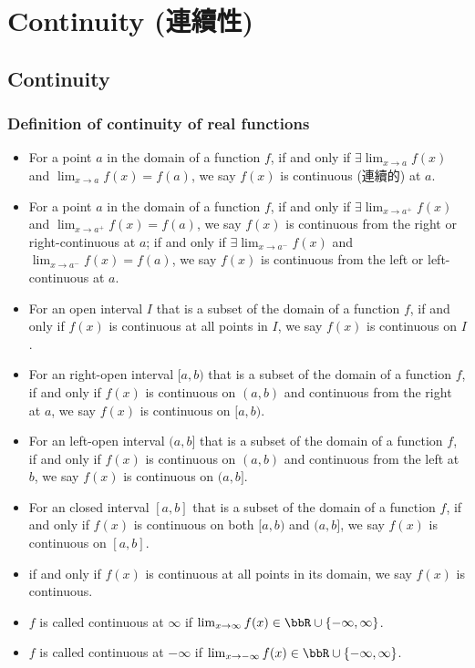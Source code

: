\section{Continuity (連續性)}
\subsection{Continuity}
\subsubsection{Definition of continuity of real functions}
\begin{itemize}
\item For a point $a$ in the domain of a function $f$, if and only if $\exists\lim_{x\to a}f(x)$ and $\lim_{x\to a}f(x)=f(a)$, we say $f(x)$ is continuous (連續的) at $a$.
\item For a point $a$ in the domain of a function $f$, if and only if $\exists\lim_{x\to a^+}f(x)$ and $\lim_{x\to a^+}f(x)=f(a)$, we say $f(x)$ is continuous from the right or right-continuous at $a$; if and only if $\exists \lim_{x\to a^-} f(x)$ and $\lim_{x\to a^-} f(x)=f(a)$, we say $f(x)$ is continuous from the left or left-continuous at $a$.
\item For an open interval $I$ that is a subset of the domain of a function $f$, if and only if $f(x)$ is continuous at all points in $I$, we say $f(x)$ is continuous on $I$.
\item For an right-open interval $[a,b)$ that is a subset of the domain of a function $f$, if and only if $f(x)$ is continuous on $(a,b)$ and continuous from the right at $a$, we say $f(x)$ is continuous on $[a,b)$.
\item For an left-open interval $(a,b]$ that is a subset of the domain of a function $f$, if and only if $f(x)$ is continuous on $(a,b)$ and continuous from the left at $b$, we say $f(x)$ is continuous on $(a,b]$.
\item For an closed interval $[a,b]$ that is a subset of the domain of a function $f$, if and only if $f(x)$ is continuous on both $[a,b)$ and $(a,b]$, we say $f(x)$ is continuous on $[a,b]$.
\item if and only if $f(x)$ is continuous at all points in its domain, we say $f(x)$ is continuous.
\item $f$ is called continuous at $\infty$ if $\lim_{x\to\infty}f(x)\in\bbR\cup\{-\infty,\infty\}$.
\item $f$ is called continuous at $-\infty$ if $\lim_{x\to-\infty}f(x)\in\bbR\cup\{-\infty,\infty\}$.
\eit

\end{itemize}
